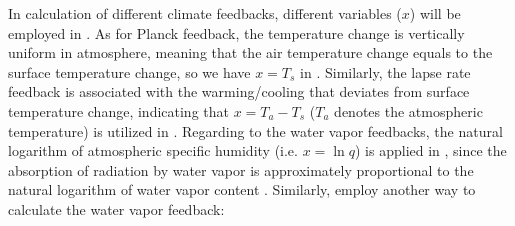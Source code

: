 In calculation of different climate feedbacks, different variables ($x$) will be employed in . As for Planck feedback, the temperature change is vertically uniform in atmosphere, meaning that the air temperature change equals to the surface temperature change, so we have $x=T_s$ in . Similarly, the lapse rate feedback is associated with the warming/cooling that deviates from surface temperature change, indicating that $x=T_a-T_s$ ($T_a$ denotes the atmospheric temperature) is utilized in .
Regarding to the water vapor feedbacks, the natural logarithm of atmospheric specific humidity (i.e. $x=\ln q$) is applied in , since the absorption of radiation by water vapor is approximately proportional to the natural logarithm of water vapor content \citep{Shell2008,Feldl2016,Liu2018}. %
Similarly, \cite{Huang2017} employ another way to calculate the water vapor feedback:

